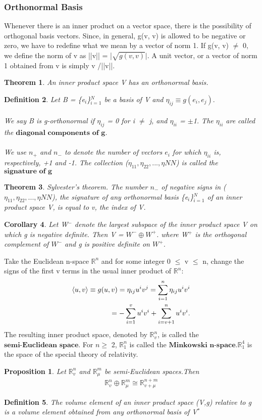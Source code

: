 \documentclass[12pt,a4paper]{article}
\newtheorem{thm}{Theorem}
\newtheorem{cor}[thm]{Corollary}
\newtheorem{defn}[thm]{Definition}
\newtheorem{prop}{Proposition}
\begin{document}
\subsubsection{Orthonormal Basis}
Whenever there is an inner product on a vector space, there is the possibility
of orthogonal basis vectors. Since, in general, g(v, v) is allowed to be negative or zero, we have to redefine what we mean by a vector of norm 1. If
g(v, v) $\ne$ 0, we define the norm of v as ||v|| = |$\sqrt{g(v,v)}|$. A unit vector, or
a vector of norm 1 obtained from v is simply v /||v||.
\begin{thm}
An inner product space V has an orthonormal basis.
\end{thm}
\begin{defn}
Let B = \{e$_i$\}$^N_{i=1}$ be a basis of V and $\eta_{ij} \equiv g(e_i, e_j).$ \\\\
We say B is g-orthonormal if $\eta_{ij}$ = 0 for i $\ne$ j, and $\eta_{ii}$ = $\pm$1. The $\eta_{ii}$ are called the $\textbf{diagonal components of g}$.\\\\
We use $n_+$ and $n_-$ to denote
the number of vectors $e_i$ for which $\eta_{ii}$ is, respectively, +1 and -1. The collection ($\eta_{11}, \eta_{22},..., \eta{NN}$) is called the $\textbf{signature of g}$
\end{defn}
\begin{thm}
Sylvester's theorem. 
The number $n_-$ of negative signs in ($\eta_{11}, \eta_{22},..., \eta{NN}$), the signature of any orthonormal basis \{e$_i$\}$^N_{i=1}$ of an inner product space V, is equal to v, the index of V.
\end{thm}
\begin{cor}
Let W$^-$ denote the largest subspace of the inner product
space V on which g is negative definite. Then V = $W^- \oplus W^+$. where W$^+$ is
the orthogonal complement of $W^-$ and g is positive definite on $W^+$.
\end{cor}
Take the Euclidean n-space $\mathbb{R}^n$ and for some integer 0 $\leq$ v $\leq$ n, change
the signs of the first v terms in the usual inner product of $\mathbb{R}^n$:
\begin{eqnarray*}
\braket{u, v} \equiv g(u,v) = \eta_{ij} u^i v^j = \sum^n_{i=1} \eta_{ij} u^i v^i\\
=-\sum^v_{i=1} u^i v^i + \sum^n_{i=v+1} u^i v^i. 
\end{eqnarray*} 
The resulting inner product space, denoted by $\mathbb{R}^n_v$, is called the $\textbf{semi-Euclidean space}$. For $n \geq$ 2, $\mathbb{R}^n_1$ is called the $\textbf{Minkowski n-space}$.$\mathbb{R}^4_1$ is the space of the special theory of relativity.
\begin{prop}
Let $\mathbb{R}^n_v$ and $\mathbb{R}^m_\mu$ be semi-Euclidean spaces.Then
\begin{eqnarray*}
\mathbb{R}^n_v \oplus \mathbb{R}^m_\mu \cong \mathbb{R}^{n+m}_{v + \mu}
\end{eqnarray*}
\end{prop}
\begin{defn}
The volume element of an inner product space (V,g)
relative to g is a volume element obtained from any orthonormal basis
of V$^*$
\end{defn}
\end{document}
